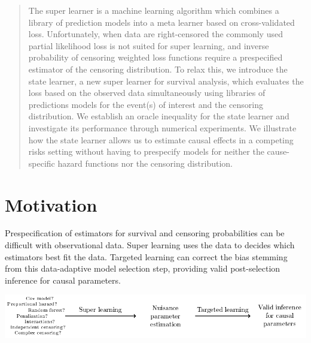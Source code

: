 \documentclass[a0,portrait]{a0poster}
\newcommand{\1}{\mathds{1}}
\begin{document}
\begin{minipage}{\textwidth}
\begin{minipage}[t]{1\linewidth}
\begin{multicols}{2}
    \color{black}    

\begin{abstract}

  The super learner is a machine learning algorithm which combines a library of
  prediction models into a meta learner based on cross-validated loss.
  Unfortunately, when data are right-censored the commonly used partial
  likelihood loss is not suited for super learning, and inverse probability of
  censoring weighted loss functions require a prespecified estimator of the
  censoring distribution. To relax this, we introduce the state learner, a new
  super learner for survival analysis, which evaluates the loss based on the
  observed data simultaneously using libraries of predictions models for the
  event(s) of interest and the censoring distribution. We establish an oracle
  inequality for the state learner and investigate its performance through
  numerical experiments. We illustrate how the state learner allows us to
  estimate causal effects in a competing risks setting without having to
  prespecify models for neither the cause-specific hazard functions nor the
  censoring distribution.
\end{abstract}




\section*{Motivation}

Prespecification of estimators for survival and censoring probabilities can be
difficult with observational data. Super learning uses the data to decides which
estimators best fit the data. Targeted learning can correct the bias stemming
from this data-adaptive model selection step, providing valid post-selection
inference for causal parameters.

\begin{center}
  \includegraphics[width=1\linewidth]{motivation.pdf}
\end{center}


\end{multicols}
\end{minipage}
\end{minipage}
\end{document}
